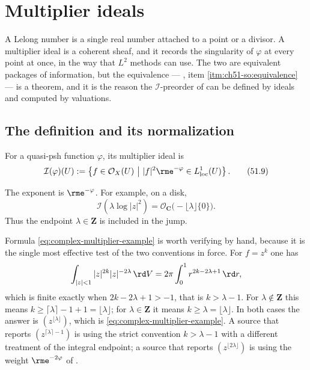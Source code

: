 \section{Multiplier ideals}
\label{sec:ch51-multiplier}

A Lelong number is a single real number attached to a point or a divisor.
A multiplier ideal is a coherent sheaf, and it records the singularity of
\(\varphi\) at every point at once, in the way that \(L^2\) methods can
use.  The two are equivalent packages of information, but the equivalence
--- , item
\cref{itm:ch51-so:equivalence} --- is a theorem, and it is the reason the
\(\mathcal I\)-preorder of  can be defined by
ideals and computed by valuations.

\subsection{The definition and its normalization}
\label{sec:ch51-multiplier-def}

\begin{definition}
\label{def:complex-multiplier-ideal}
For a quasi-psh function \(\varphi\), its multiplier ideal is
\[
 \mathcal I(\varphi)(U)
 :=\left\{f\in\mathcal O_X(U)\ \middle|\
 |f|^2\rme^{-\varphi}\in L^1_{\mathrm{loc}}(U)\right\}.
\tag{51.9}\label{eq:complex-multiplier-ideal}
\]
\end{definition}

The exponent is \(\rme^{-\varphi}\).  For example, on a disk,
\[
 \mathcal I\!\left(\lambda\log|z|^2\right)
       =\mathcal O_{\mathbf C}\bigl(-\lfloor\lambda\rfloor\{0\}\bigr).
\tag{51.10}\label{eq:complex-multiplier-example}
\]
Thus the endpoint \(\lambda\in\mathbf Z\) is included in the jump.

Formula \eqref{eq:complex-multiplier-example} is worth verifying by hand,
because it is the single most effective test of the two conventions in
force.  For \(f=z^k\) one has
\[
 \int_{|z|<1}|z|^{2k}|z|^{-2\lambda}\,\rd V
 =2\pi\int_0^1r^{2k-2\lambda+1}\,\rd r,
\]
which is finite exactly when \(2k-2\lambda+1>-1\), that is
\(k>\lambda-1\).  For \(\lambda\notin\mathbf Z\) this means
\(k\geq\lceil\lambda\rceil-1+1=\lfloor\lambda\rfloor\); for
\(\lambda\in\mathbf Z\) it means \(k\geq\lambda=\lfloor\lambda\rfloor\).
In both cases the answer is \((z^{\lfloor\lambda\rfloor})\), which is
\eqref{eq:complex-multiplier-example}.  A source that reports
\((z^{\lceil\lambda\rceil-1})\) is using the strict convention
\(k>\lambda-1\) with a different treatment of the integral endpoint; a
source that reports \((z^{\lfloor2\lambda\rfloor})\) is using the weight
\(\rme^{-2\varphi}\) of \Cref{warn:ch51-half-log}.

